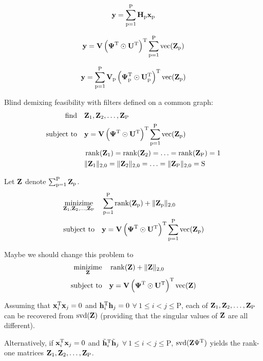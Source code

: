 \documentclass{article}
\newcommand{\numSources}{\text{P}}
\newcommand{\sourceIndex}{\text{p}}
\DeclareMathOperator{\vect}{vec}
\DeclareMathOperator{\rank}{rank}
\DeclareMathOperator{\svd}{svd}
\begin{document}
\begin{equation}
  \bby = \sum_{\sourceIndex=1}^{\numSources} \bbH_{\sourceIndex} \bbx_{\sourceIndex}
\end{equation}

\begin{equation}
  \bby = \bbV \left(\bbPsi^{\rmT} \odot \bbU^{\rmT} \right)^{\rmT}\sum_{\sourceIndex=1}^{\numSources} \vect(\bbZ_{\sourceIndex})
\end{equation}

\begin{equation}
  \bby = \sum_{\sourceIndex=1}^{\numSources} \bbV_{\sourceIndex} \left(\bbPsi_{\sourceIndex}^{\rmT} \odot \bbU_{\sourceIndex}^{\rmT} \right)^{\rmT} \vect(\bbZ_{\sourceIndex})
\end{equation}

Blind demixing feasibility with filters defined on a common graph:
\begin{align}
  \mathop{\text{find}} \quad & \bbZ_{1}, \bbZ_{2}, \ldots, \bbZ_{\numSources} \\
  \text{subject to} \quad & \bby = \bbV \left(\bbPsi^{\rmT} \odot \bbU^{\rmT} \right)^{\rmT}\sum_{\sourceIndex=1}^{\numSources} \vect(\bbZ_{\sourceIndex}) \nonumber \\
  & \rank(\bbZ_{1}) = \rank(\bbZ_{2}) = \ldots = \rank(\bbZ_{\numSources}) = 1 \nonumber \\
  & \|\bbZ_{1}\|_{2,0} = \|\bbZ_{2}\|_{2,0} = \ldots = \|\bbZ_{\numSources}\|_{2,0} = \rmS \nonumber
\end{align}

Let ${\mathbf Z}$ denote $\sum_{\sourceIndex=1}^{\numSources} \bbZ_{\sourceIndex}$.
\begin{align}
  \mathop{\text{minizime}}_{\bbZ_{1},\bbZ_{2},\ldots,\bbZ_{\numSources}} \quad & \sum_{\sourceIndex=1}^{\numSources} \rank(\bbZ_{\sourceIndex}) + \|\bbZ_{\sourceIndex}\|_{2,0} \\
  \text{subject to} \quad & \bby = \bbV \left(\bbPsi^{\rmT} \odot \bbU^{\rmT} \right)^{\rmT}\sum_{\sourceIndex=1}^{\numSources} \vect(\bbZ_{\sourceIndex}) \nonumber
\end{align}

Maybe we should change this problem to 
\begin{align}
  \mathop{\text{minizime}}_{\bbZ} \quad & \rank(\bbZ) + \|\bbZ\|_{2,0} \\
  \text{subject to} \quad & \bby = \bbV \left(\bbPsi^{\rmT} \odot \bbU^{\rmT} \right)^{\rmT} \vect(\bbZ) \nonumber
\end{align}

Assuming that ${\mathbf x}_{i}^{{\text{T}}} {\mathbf x}_{j} = 0$ and ${\mathbf h}_{i}^{{\text{T}}} {\mathbf h}_{j} = 0$ $\forall \ 1 \leqslant i < j \leqslant \numSources$, each of $\bbZ_{1},\bbZ_{2},\ldots,\bbZ_{\numSources}$ can be recovered from $\svd(\bbZ)$ (providing that the singular values of ${\mathbf Z}$ are all different).

Alternatively, if ${\mathbf x}_{i}^{{\text{T}}} {\mathbf x}_{j} = 0$ and $\tilde {{\mathbf h}}_{i}^{{\text{T}}} \tilde {{\mathbf h}}_{j}$ $\forall \ 1 \leqslant i < j \leqslant \numSources$, $\svd(\bbZ \Psi^{\rmT})$ yields the rank-one matrices $\bbZ_{1},\bbZ_{2},\ldots,\bbZ_{\numSources}$.
\end{document}
